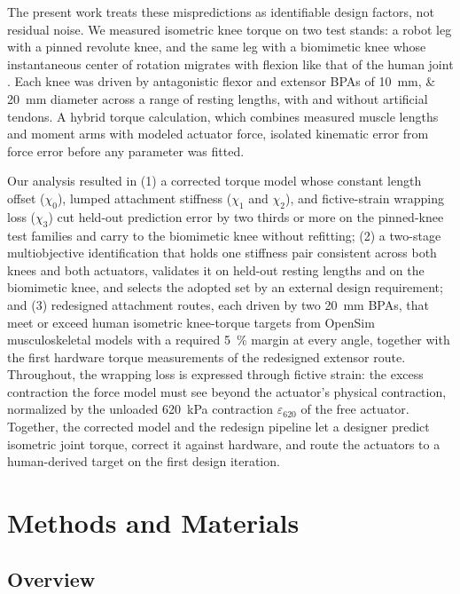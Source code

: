 \documentclass[utf8]{FrontiersinHarvard} %
\begin{document}
The present work treats these mispredictions as identifiable design factors, not residual noise. We measured isometric knee torque on two test stands: a robot leg with a pinned revolute knee, and the same leg with a biomimetic knee whose instantaneous center of rotation migrates with flexion like that of the human joint \citep{steele_biomimetic_2018, steele_development_2017}. Each knee was driven by antagonistic flexor and extensor BPAs of \qtylist{10;20}{\mm} diameter across a range of resting lengths, with and without artificial tendons. A hybrid torque calculation, which combines measured muscle lengths and moment arms with modeled actuator force, isolated kinematic error from force error before any parameter was fitted.

Our analysis resulted in (1) a corrected torque model whose constant length offset ($\chi_0$), lumped attachment stiffness ($\chi_1$ and $\chi_2$), and fictive-strain wrapping loss ($\chi_3$) cut held-out prediction error by two thirds or more on the pinned-knee test families and carry to the biomimetic knee without refitting; (2) a two-stage multiobjective identification that holds one stiffness pair consistent across both knees and both actuators, validates it on held-out resting lengths and on the biomimetic knee, and selects the adopted set by an external design requirement; and (3) redesigned attachment routes, each driven by two \qty{20}{\mm} BPAs, that meet or exceed human isometric knee-torque targets from OpenSim musculoskeletal models \citep{seth_opensim_2018, delp_interactive_1990} with a required \qty{5}{\percent} margin at every angle, together with the first hardware torque measurements of the redesigned extensor route. Throughout, the wrapping loss is expressed through fictive strain: the excess contraction the force model must see beyond the actuator's physical contraction, normalized by the unloaded \qty{620}{\kPa} contraction $\varepsilon_{620}$ of the free actuator. Together, the corrected model and the redesign pipeline let a designer predict isometric joint torque, correct it against hardware, and route the actuators to a human-derived target on the first design iteration.


\section{Methods and Materials}\label{sec:methods}

\subsection{Overview}
\end{document}
